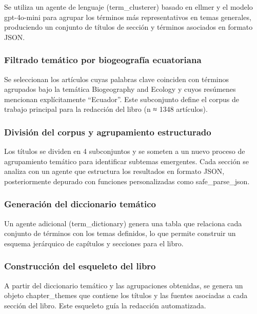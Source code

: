 \documentclass[
  letterpaper,
  DIV=11,
  numbers=noendperiod,
  oneside]{scrreprt}
\begin{document}
Se utiliza un agente de lenguaje (term\_clusterer) basado en ellmer y el
modelo gpt-4o-mini para agrupar los términos más representativos en
temas generales, produciendo un conjunto de títulos de sección y
términos asociados en formato JSON.

\subsubsection{Filtrado temático por biogeografía
ecuatoriana}\label{filtrado-temuxe1tico-por-biogeografuxeda-ecuatoriana}

Se seleccionan los artículos cuyas palabras clave coinciden con términos
agrupados bajo la temática Biogeography and Ecology y cuyos resúmenes
mencionan explícitamente ``Ecuador''. Este subconjunto define el corpus
de trabajo principal para la redacción del libro (n ≈ 1348 artículos).

\subsubsection{División del corpus y agrupamiento
estructurado}\label{divisiuxf3n-del-corpus-y-agrupamiento-estructurado}

Los títulos se dividen en 4 subconjuntos y se someten a un nuevo proceso
de agrupamiento temático para identificar subtemas emergentes. Cada
sección se analiza con un agente que estructura los resultados en
formato JSON, posteriormente depurado con funciones personalizadas como
safe\_parse\_json.

\subsubsection{Generación del diccionario
temático}\label{generaciuxf3n-del-diccionario-temuxe1tico}

Un agente adicional (term\_dictionary) genera una tabla que relaciona
cada conjunto de términos con los temas definidos, lo que permite
construir un esquema jerárquico de capítulos y secciones para el libro.

\subsubsection{Construcción del esqueleto del
libro}\label{construcciuxf3n-del-esqueleto-del-libro}

A partir del diccionario temático y las agrupaciones obtenidas, se
genera un objeto chapter\_themes que contiene los títulos y las fuentes
asociadas a cada sección del libro. Este esqueleto guía la redacción
automatizada.
\end{document}
